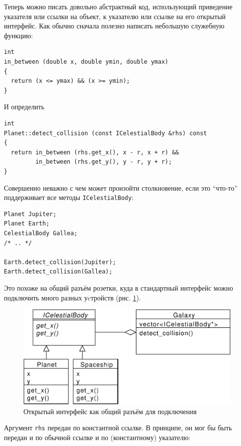 \documentclass[a4paper,12pt,oneside]{article}
\begin{document}
Теперь можно писать довольно абстрактный код, использующий приведение указателя или ссылки на объект, к указателю или ссылке на его открытый интерфейс. Как обычно сначала полезно написать небольшую служебную функцию:

\begin{lstlisting}
int 
in_between (double x, double ymin, double ymax)
{
  return (x <= ymax) && (x >= ymin);
}
\end{lstlisting}

И определить

\begin{lstlisting}
int 
Planet::detect_collision (const ICelestialBody &rhs) const
{
  return in_between (rhs.get_x(), x - r, x + r) && 
         in_between (rhs.get_y(), y - r, y + r);
}
\end{lstlisting}

Совершенно неважно с чем может произойти столкновение, если это ``что-то'' поддерживает все методы \lstinline!ICelestialBody!:

\begin{lstlisting}
Planet Jupiter;
Planet Earth;
CelestialBody Gallea;
/* .. */

Earth.detect_collision(Jupiter); 
Earth.detect_collision(Gallea);
\end{lstlisting}

Это похоже на общий разъём розетки, куда в стандартный интерфейс можно подключить много разных уcтройств (рис. \ref{fig:common-intf}).

\begin{figure}[ht]
\centering
\includegraphics[width=1.0\textwidth]{illustrations/common-intf-crop.pdf}
\caption{Открытый интерфейс как общий разъём для подключения}
\label{fig:common-intf}
\end{figure}

Аргумент \lstinline!rhs! передан по константной ссылке. В принципе, он мог бы быть передан и по обычной ссылке и по (константному) указателю:
\end{document}
